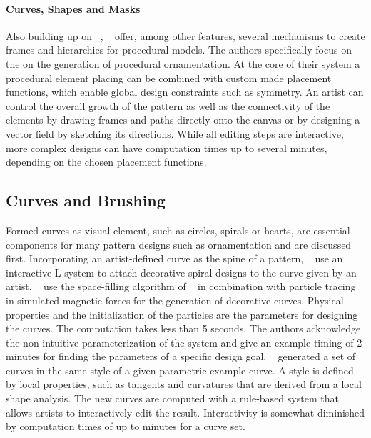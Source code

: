 {\paragraph*{Curves, Shapes and Masks} Also building up on \citeauthor*{wong_1998_cgf}~\cite{wong_1998_cgf}, \citeauthor*{gieseke_2017_ooo}~\cite{gieseke_2017_ooo} offer, among other features, several mechanisms to create frames and hierarchies for procedural models. The authors specifically focus on the on the generation of procedural ornamentation. At the core of their system a procedural element placing can be combined with custom made placement functions, which enable global design constraints such as symmetry. An artist can control the overall growth of the pattern as well as the connectivity of the elements by drawing frames and paths directly onto the canvas or by designing a vector field by sketching its directions. While all editing steps are interactive, more complex designs can have computation times up to several minutes, depending on the chosen placement functions.}


\subsection{Curves and Brushing}
\label{subsec:analysis_curves}


Formed curves as visual element, such as circles, spirals or hearts, are essential components for many pattern designs such as ornamentation and are discussed first. Incorporating an artist-defined curve as the spine of a pattern, \citeauthor*{yu_2012_ans}~\cite{yu_2012_ans} use an interactive L-system to attach decorative spiral designs to the curve given by an artist. \citeauthor*{xu_2009_mcc}~\cite{xu_2009_mcc} use the space-filling algorithm of \citeauthor*{wong_1998_cgf}~\cite{wong_1998_cgf} in combination with particle tracing in simulated magnetic forces for the generation of decorative curves. Physical properties and the initialization of the particles are the parameters for designing the curves. The computation takes less than 5 seconds. The authors acknowledge the non-intuitive parameterization of the system and give an example timing of 2 minutes for finding the parameters of a specific design goal. \citeauthor*{merrell_2010_ecs}~\cite{merrell_2010_ecs} generated a set of curves in the same style of a given parametric example curve. A style is defined by local properties, such as tangents and curvatures that are derived from a local shape analysis. The new curves are computed with a rule-based system that allows artists to interactively edit the result. Interactivity is somewhat diminished by computation times of up to minutes for a curve set. 

